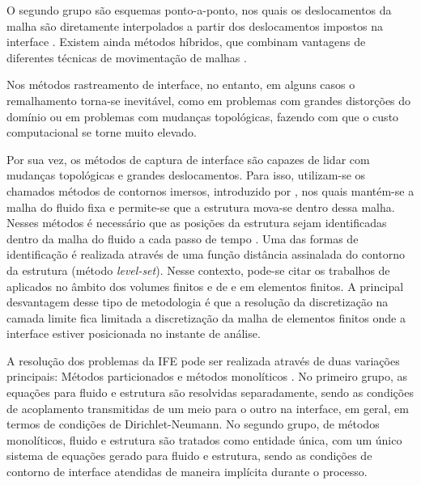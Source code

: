 \documentclass[tese_patricia.tex]{subfiles}
\begin{document}
O segundo grupo são esquemas ponto-a-ponto, nos quais os deslocamentos da malha são diretamente interpolados a partir dos deslocamentos impostos na interface \cite{DoneaGH:1982,TezduyarABJ:1993,SanchesC:2014}. Existem ainda métodos híbridos, que combinam vantagens de diferentes técnicas de movimentação de malhas \cite{Lefrancois:2008,FernandesCS:2019}. 

Nos métodos rastreamento de interface, no entanto, em alguns casos o remalhamento torna-se inevitável, como em problemas com grandes distorções do domínio ou em problemas com mudanças topológicas, fazendo com que o custo computacional se torne muito elevado.

Por sua vez, os métodos de captura de interface são capazes de lidar com mudanças topológicas e grandes deslocamentos. Para isso, utilizam-se os chamados métodos de contornos imersos, introduzido por , nos quais mantém-se a malha do fluido fixa e permite-se que a estrutura mova-se dentro dessa malha. Nesses métodos é necessário que as posições da estrutura sejam identificadas dentro da malha do fluido a cada passo de tempo \cite{MittalI:2005,WangRGF:2011}. Uma das formas de identificação é realizada através de uma função distância assinalada do contorno da estrutura (método \textit{level-set}). Nesse contexto, pode-se citar os trabalhos de   aplicados no âmbito dos volumes finitos e de  e  em elementos finitos. A principal desvantagem desse tipo de metodologia é que a resolução da discretização na camada limite fica limitada a discretização da malha de elementos finitos onde a interface estiver posicionada no instante de análise.

A resolução dos problemas da IFE pode ser realizada através de duas variações principais: Métodos particionados \cite{RouxG:2009,BazilevsHKWB:2011, SanchesC:2013,SanchesC:2014,FernandesCS:2019} e métodos monolíticos \cite{Blom:1998,Hubneretal:2004,HronM:2007,Avancini:2023}. No primeiro grupo, as equações para fluido e estrutura são resolvidas separadamente, sendo as condições de acoplamento transmitidas de um meio para o outro na interface, em geral, em termos de condições de Dirichlet-Neumann. No segundo grupo, de métodos monolíticos, fluido e estrutura são tratados como entidade única, com um único sistema de equações gerado para fluido e estrutura, sendo as condições de contorno de interface atendidas de maneira implícita durante o processo.
\end{document}
